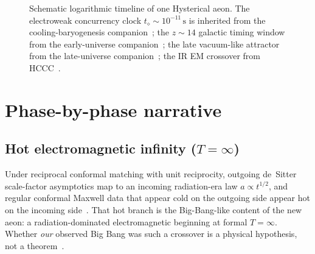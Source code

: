 \documentclass[11pt]{article}
\begin{document}
\begin{figure}[ht]
\caption{Schematic logarithmic timeline of one Hysterical aeon.
The electroweak concurrency clock $t_\diamond\sim10^{-11}\,\mathrm{s}$ is inherited
from the cooling-baryogenesis companion~\cite{boyd2026cooling,DOnofrio2014};
the $z\sim14$ galactic timing window from the early-universe
companion~\cite{boyd2026early,Carniani2024}; the late vacuum-like attractor from
the late-universe companion~\cite{boyd2026late}; the IR EM crossover from
HCCC~\cite{boyd2026ccc}.}
\label{fig:aeon-timeline}
\end{figure}

\section{Phase-by-phase narrative}
\label{sec:phases}

\subsection{\texorpdfstring{Hot electromagnetic infinity ($T=\infty$)}{Hot electromagnetic infinity}}
Under reciprocal conformal matching with unit reciprocity, outgoing de~Sitter
scale-factor asymptotics map to an incoming radiation-era law
$a\propto t^{1/2}$, and regular conformal Maxwell data that appear cold on the
outgoing side appear hot on the incoming side~\cite{boyd2026ccc}.
That hot branch is the Big-Bang-like content of the new aeon: a radiation-dominated
electromagnetic beginning at formal $T=\infty$.
Whether \emph{our} observed Big Bang was such a crossover is a physical hypothesis,
not a theorem~\cite{boyd2026ccc}.
\end{document}

